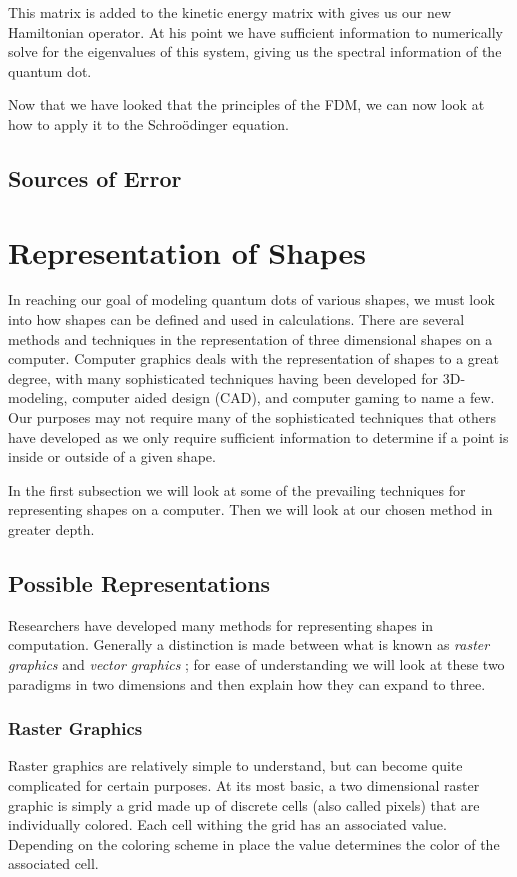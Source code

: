 \documentclass[authoryearcitations]{UoYCSproject}
\begin{document}
This matrix is added to the kinetic energy matrix with gives us our new Hamiltonian operator. At his point
we have sufficient information to numerically solve for the eigenvalues of this system, giving us the spectral information
of the quantum dot.  
 

Now that we have looked that the principles of the FDM, we can now look at how to apply it to the Schro\"{o}dinger equation.

\subsection{Sources of Error}

\section{Representation of Shapes}
In reaching our goal of modeling quantum dots of various shapes, we must look into how shapes can be defined and used in 
calculations. There are several methods and techniques in the representation of three dimensional shapes on a computer. 
Computer graphics deals with the representation of shapes to a great degree, with many sophisticated techniques having been 
developed for 3D-modeling, computer aided design (CAD), and computer gaming to name a few. Our purposes may not require
many of the sophisticated techniques that others have developed as we only require sufficient information to determine if
a point is inside or outside of a given shape. 

In the first subsection we will look at some of the prevailing techniques for representing shapes on a computer. Then we will 
look at our chosen method in greater depth. 

\subsection{Possible Representations}
Researchers have developed many methods for representing shapes in computation. Generally a distinction is made between what is 
known as \emph{raster graphics} and \emph{vector graphics} \cite{bors}; for ease of understanding we will look at these two 
paradigms in two dimensions and then explain how they can expand to three. 

\subsubsection{Raster Graphics}
Raster graphics are relatively simple to understand, but can become quite complicated for certain purposes. At its most basic, 
a two dimensional raster graphic is simply a grid made up of discrete cells (also called pixels) that are individually colored.  
Each cell withing the grid has an associated value. Depending on the coloring scheme in place the value determines the 
color of the associated cell. 
\end{document}
